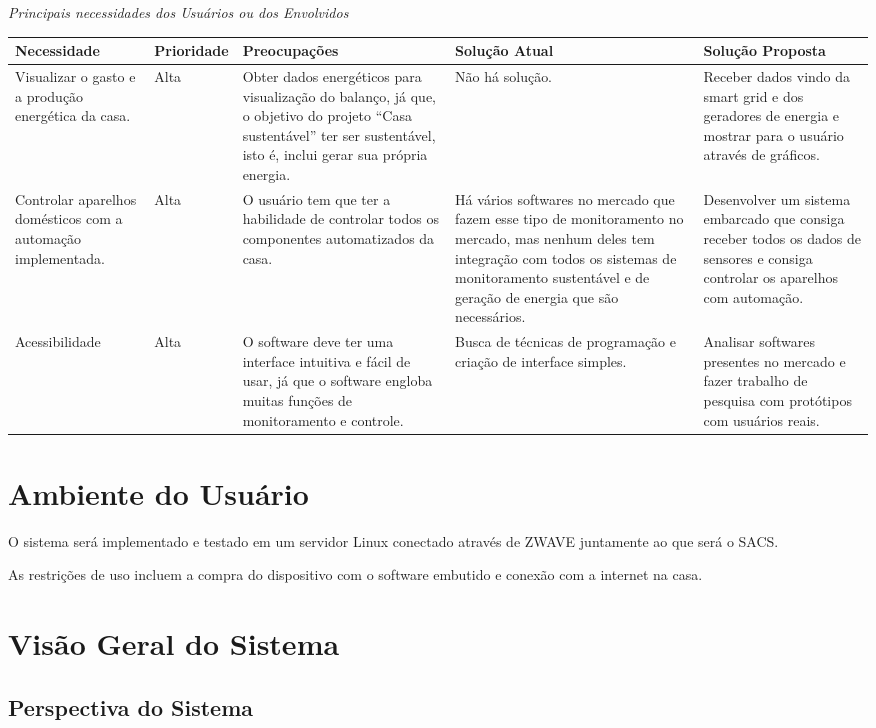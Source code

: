 \textit{Principais necessidades dos Usuários ou dos Envolvidos}

\begin{longtable}{|m{2.75cm}|m{2cm}|m{3cm}|m{4cm}|m{4cm}|}
	\hline \textbf{Necessidade} & \textbf{Prioridade} & \textbf{Preocupações} & \textbf{Solução Atual} & \textbf{Solução Proposta}\\
	\hline 
Visualizar o gasto e a produção energética da casa.
&
Alta
&
Obter dados energéticos para visualização do balanço, já que, o objetivo do projeto “Casa sustentável” ter ser sustentável, isto é, inclui gerar sua própria energia.
&
Não há solução.
&
Receber dados vindo da smart grid e dos geradores de energia e mostrar para o usuário através de gráficos.
\\
	\hline 
Controlar aparelhos domésticos com a automação implementada.
&
Alta
&
O usuário tem que ter a habilidade de controlar todos os componentes automatizados da casa.
&
Há vários softwares no mercado que fazem esse tipo de monitoramento no mercado, mas nenhum deles tem integração com todos os sistemas de monitoramento sustentável e de geração de energia que são necessários.
&
Desenvolver um sistema embarcado que consiga receber todos os dados de sensores e consiga controlar os aparelhos com automação.
\\
	\hline
Acessibilidade
&
Alta
&
O software deve ter uma interface intuitiva e fácil de usar, já que o software engloba muitas funções de monitoramento e controle.
&
Busca de técnicas de programação e criação de interface simples.
&
Analisar softwares presentes no mercado e fazer trabalho de pesquisa com protótipos com usuários reais.
\\
	\hline
\end{longtable}

\section{Ambiente do Usuário}

	O sistema será implementado e testado em um servidor Linux conectado através de ZWAVE juntamente ao que será o SACS.

	As restrições de uso incluem a compra do dispositivo com o software embutido e conexão com a internet na casa.

\section{Visão Geral do Sistema}

\subsection{Perspectiva do Sistema}

